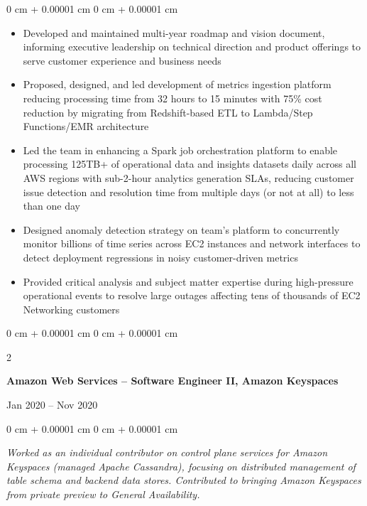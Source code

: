 \documentclass[10pt, letterpaper]{article}
\DeclareRobustCommand{\decorativeicon}[1]{%
    \BeginAccSupp{method=escape,ActualText={}}#1\EndAccSupp{}%
}
\newcommand{\companylogo}[1]{\decorativeicon{#1}\hspace{0.5em}}
\newenvironment{highlights}{
    \begin{itemize}[
        topsep=0.10 cm,
        parsep=0.10 cm,
        partopsep=0pt,
        itemsep=0pt,
        leftmargin=0 cm + 10pt
    ]
}{
    \end{itemize}
} %
\newenvironment{onecolentry}{
    \begin{adjustwidth}{
        0 cm + 0.00001 cm
    }{
        0 cm + 0.00001 cm
    }
}{
    \end{adjustwidth}
} %
\newenvironment{twocolentry}[2][]{
    \needspace{4\baselineskip} %
    \onecolentry
    \def\secondColumn{#2}
    \setcolumnwidth{\fill, 4.5 cm}
    \begin{paracol}{2}
}{
    \switchcolumn \raggedleft \secondColumn
    \end{paracol}
    \endonecolentry
} %
\begin{document}
        \vspace{0.05 cm}
        \begin{onecolentry}
            \begin{highlights}
                \item Developed and maintained multi-year roadmap and vision document, informing executive leadership on technical direction and product offerings to serve customer experience and business needs
                \item Proposed, designed, and led development of metrics ingestion platform reducing processing time from 32 hours to 15 minutes with 75\% cost reduction by migrating from Redshift-based ETL to Lambda/Step Functions/EMR architecture
                \item Led the team in enhancing a Spark job orchestration platform to enable processing 125TB+ of operational data and insights datasets daily across all AWS regions with sub-2-hour analytics generation SLAs, reducing customer issue detection and resolution time from multiple days (or not at all) to less than one day
                \item Designed anomaly detection strategy on team's platform to concurrently monitor billions of time series across EC2 instances and network interfaces to detect deployment regressions in noisy customer-driven metrics
                \item Provided critical analysis and subject matter expertise during high-pressure operational events to resolve large outages affecting tens of thousands of EC2 Networking customers
            \end{highlights}
        \end{onecolentry}

        \vspace{0.2 cm}

        \begin{twocolentry}{
            Jan 2020 – Nov 2020
        }
            \textbf{\companylogo{\faAws}Amazon Web Services – Software Engineer II, Amazon Keyspaces}
        \end{twocolentry}

        \vspace{0.05 cm}
        \begin{onecolentry}
            \textit{Worked as an individual contributor on control plane services for Amazon Keyspaces (managed Apache Cassandra), focusing on distributed management of table schema and backend data stores. Contributed to bringing Amazon Keyspaces from private preview to General Availability.}
        \end{onecolentry}
\end{document}
